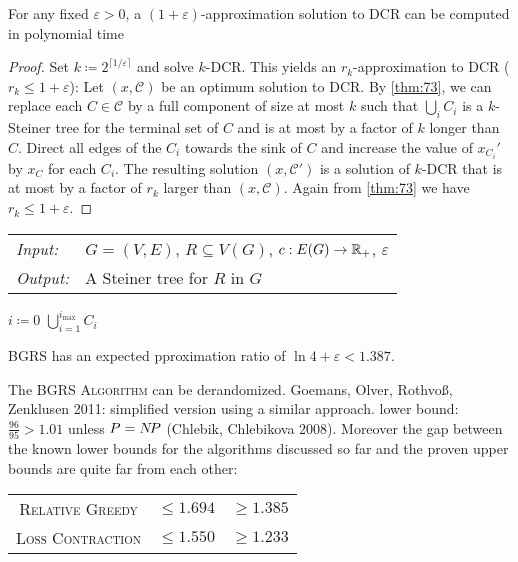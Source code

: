 \documentclass[../skript.tex]{subfiles}
\begin{document}
\begin{lemma} %
\label{thm:81}
For any fixed $\varepsilon > 0$, a $(1 + \varepsilon)$-approximation solution to DCR can be computed in polynomial time
\end{lemma}
\begin{proof}
Set $k \coloneqq 2^{\lceil 1/\varepsilon \rceil}$ and solve $k$-DCR. This yields an $r_k$-approximation to DCR ($r_k \leq 1 + \varepsilon$):
Let $(x, \mathscr{C})$ be an optimum solution to DCR. By \cref{thm:73}, we can replace each $C \in \mathscr{C}$ by a full component of size at most $k$ such that $\bigcup_i C_i$ is a $k$-Steiner tree for the terminal set of $C$ and is at most by a factor of $k$ longer than $C$. Direct all edges of the $C_i$ towards the sink of $C$ and increase the value of $x_{C_i}'$ by $x_C$ for each $C_i$. The resulting solution $(x, \mathscr{C}')$ is a solution of $k$-DCR that is at most by a factor of $r_k$ larger than $(x, \mathscr{C})$.
Again from \cref{thm:73} we have $r_k \leq 1 + \varepsilon$.
\end{proof}
\begin{algorithmbox}
\begin{tabular}{@{}ll}
\textit{Input:} & $G = (V, E)$, $R \subseteq V(G)$, $c : E(G) \to \mathbb{R}_+$, $\varepsilon$\\
\textit{Output:} & A Steiner tree for $R$ in $G$
\end{tabular}
\end{algorithmbox}
\vspace{-7pt}
\begin{algorithm}[H]
$i \coloneqq 0$\;
\Return $\bigcup_{i=1}^{i_{\max}} C_i$\;
\end{algorithm}
\vspace{-7pt}
\EndAlgorithmLine
\begin{theorem} %
BGRS has an expected pproximation ratio of $\ln 4 + \varepsilon < 1.387$.
\end{theorem}
The \textsc{BGRS Algorithm} can be derandomized.
Goemans, Olver, Rothvoß, Zenklusen \lbrack{}2011\rbrack{}: simplified version using a similar approach.
lower bound: $\frac{96}{95} > 1.01$ unless $P = N \! P$ (Chlebik, Chlebikova \lbrack{}2008\rbrack{}). Moreover the gap between the known lower bounds for the algorithms discussed so far and the proven upper bounds are quite far from each other:
\begin{center}
\begin{tabular}{ccc}
\textsc{Relative Greedy} & ${} \leq 1.694$ & ${} \geq 1.385$ \\
\textsc{Loss Contraction} & ${} \leq 1.550$ & ${} \geq 1.233$
\end{tabular}
\end{center}
\end{document}
